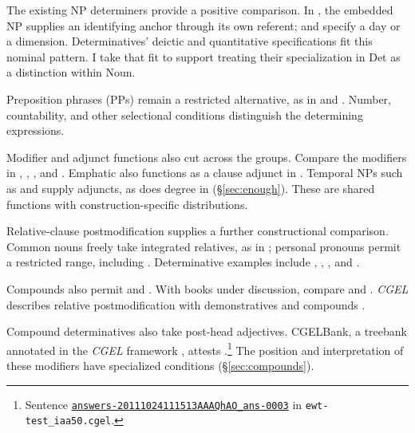 \documentclass[12pt]{article}
\begin{document}
The existing NP determiners provide a positive comparison. In , the embedded NP supplies an identifying anchor through its own referent;  and  specify a day or a dimension. Determinatives' deictic and quantitative specifications fit this nominal pattern. I take that fit to support treating their specialization in Det as a distinction within Noun.

Preposition phrases (PPs) remain a restricted alternative, as in  and  \citep[356]{huddleston2002}. Number, countability, and other selectional conditions distinguish the determining expressions.

Modifier and adjunct functions also cut across the groups. Compare the modifiers in , , , and . Emphatic  also functions as a clause adjunct in  \citep[1496--1497]{huddleston2002}. Temporal NPs such as  and  supply adjuncts, as does degree  in  (§\ref{sec:enough}). These are shared functions with construction-specific distributions.

Relative-clause postmodification supplies a further constructional comparison. Common nouns freely take integrated relatives, as in ; personal pronouns permit a restricted range, including  \citep[430]{huddleston2002}. Determinative examples include , , , and .

Compounds also permit  and . With books under discussion, compare  and . \textit{CGEL} describes relative postmodification with demonstratives and compounds \citep[414, 422--423]{huddleston2002}.

Compound determinatives also take post-head adjectives. CGELBank, a treebank annotated in the \textit{CGEL} framework \citep{reynolds2023unified}, attests .\footnote{Sentence \href{https://github.com/nert-nlp/cgel/blob/d0a2c2d8c522b23d5aa879fc9cb94948f4285b2c/datasets/ewt-test_iaa50.cgel\#L179-L181}{\nolinkurl{answers-20111024111513AAAQhAO_ans-0003}} in \nolinkurl{ewt-test_iaa50.cgel}.} The position and interpretation of these modifiers have specialized conditions (§\ref{sec:compounds}).
\end{document}
